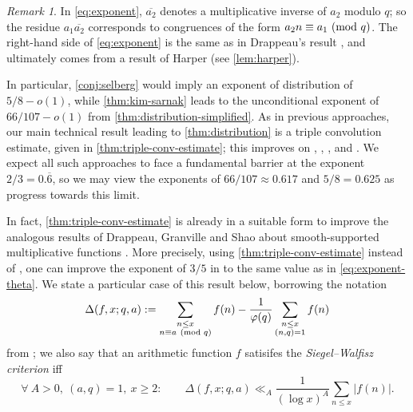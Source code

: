 \documentclass[reqno,11pt]{amsart}
\theoremstyle{definition}
\theoremstyle{remark}
\newtheorem*{remark}{Remark}
\numberwithin{equation}{section}
\renewcommand{\bar}{\overline}
\renewcommand{\pmod}[1]{\ (\textnormal{mod } #1)}
\begin{document}
\begin{remark}
In \cref{eq:exponent}, $\bar{a_2}$ denotes a multiplicative inverse of $a_2$ modulo $q$; so the residue $a_1\bar{a_2}$ corresponds to congruences of the form $a_2 n \equiv a_1 \pmod{q}$. The right-hand side of \cref{eq:exponent} is the same as in Drappeau's result \cite[Th\'eor\`eme 1]{drappeau2015theoremes}, and ultimately comes from a result of Harper (see \cref{lem:harper}). 
\end{remark}

In particular, \cref{conj:selberg} would imply an exponent of distribution of $5/8 - o(1)$, while \cref{thm:kim-sarnak} leads to the unconditional exponent of $66/107 - o(1)$ from \cref{thm:distribution-simplified}. %
As in previous approaches, our main technical result leading to \cref{thm:distribution} is a triple convolution estimate, given in \cref{thm:triple-conv-estimate}; this improves on \cite[Th\'eor\`eme 4]{bombieri1986primes}, \cite[Th\'eor\`eme 3]{drappeau2015theoremes}, \cite[Lemma 2.3]{drappeau2017smooth}, and \cite[Proposition 8.3]{maynard2020primes}. We expect all such approaches to face a fundamental barrier at the exponent $2/3 = 0.\bar{6}$, so we may view the exponents of $66/107 \approx 0.617$ and $5/8 = 0.625$ as progress towards this limit.

In fact, \cref{thm:triple-conv-estimate} is already in a suitable form to improve the analogous results of Drappeau, Granville and Shao about smooth-supported multiplicative functions \cite{drappeau2017smooth}. More precisely, using \cref{thm:triple-conv-estimate} instead of \cite[Lemma 2.3]{drappeau2017smooth}, one can improve the exponent of $3/5$ in \cite[Theorem 1.2]{drappeau2017smooth} to the same value as in \cref{eq:exponent-theta}. We state a particular case of this result below, borrowing the notation
\[
    \Delta(f, x; q, a) := \sum_{\substack{n \le x \\ n \equiv a \pmod{q}}} f(n) 
    -
    \frac{1}{\varphi(q)} \sum_{\substack{n \le x \\ (n, q) = 1}} f(n)
\]
from \cite{drappeau2017smooth}; we also say that an arithmetic function $f$ satisifes the \emph{Siegel--Walfisz criterion} iff
\[
    \forall\ A > 0,\ (a, q) = 1,\ x \ge 2 : 
    \qquad 
    \Delta(f, x; q, a) \ll_A \frac{1}{(\log x)^A} \sum_{n \le x} |f(n)|.
\]
\end{document}
